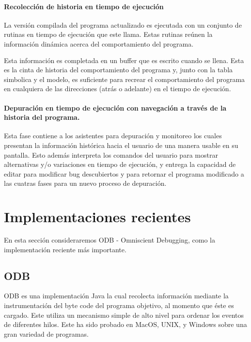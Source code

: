 \documentclass[12pt,legalpaper]{report}
\begin{document}
				\paragraph[Recolección de historia]{Recolección de historia en tiempo de ejecución}

La versión compilada del programa actualizado es ejecutada con un conjunto de rutinas en tiempo de ejecución que este llama.  Estas rutinas reúnen la información dinámica acerca del comportamiento del programa.

Esta información es completada en un buffer que es escrito cuando se llena.  Esta es la cinta de historia del comportamiento del programa y, junto con la tabla simbolica y el modelo, es suficiente para recrear el comportamiento del programa en cualquiera de las direcciones (atrás o adelante) en el tiempo de ejecución.

				\paragraph[Historia del programa]{Depuración en tiempo de ejecución con navegación a través de la historia del programa.}

Esta fase contiene a los asistentes para depuración y monitoreo los cuales presentan la información histórica hacia el usuario de una manera usable en su pantalla.  Esto además interpreta los comandos del usuario para mostrar alternativas y/o variaciones en tiempo de ejecución, y entrega la capacidad de editar para modificar bug descubiertos y para retornar el programa modificado a las cuatras fases para un nuevo proceso de depuración.


	\section{Implementaciones recientes}

En esta sección consideraremos ODB - Omniscient Debugging, como la implementación reciente más importante.

		\subsection{ODB}

ODB es una implementación Java la cual recolecta información mediante la instrumentación del byte code del programa objetivo, al momento que éste es cargado.  Este utiliza un mecanismo simple de alto nivel para ordenar los eventos de diferentes hilos.  Este ha sido probado en MacOS, UNIX, y Windows sobre una gran variedad de programas.
\end{document}
